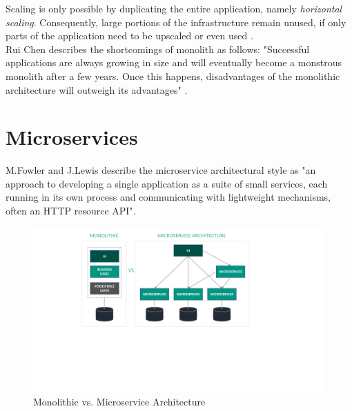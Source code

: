 Scaling is only possible by duplicating the entire application, namely \textit{horizontal scaling}. Consequently, large portions of the infrastructure remain unused, if only parts of the application need to be upscaled or even used \cite{EnticeApproach} \cite{MigratingTowardsSurvey}. \\
Rui Chen describes the shortcomings of monolith as follows: "Successful applications
are always growing in size and will eventually become a
monstrous monolith after a few years. Once this happens,
disadvantages of the monolithic architecture will outweigh
its advantages" \cite{DataflowDrivenChen}.



\section{Microservices}
\label{sec:background:microservices}
M.Fowler and J.Lewis describe the microservice architectural style as "an approach to developing a single application as a suite of small services, each running in its own process and communicating with lightweight mechanisms, often an HTTP resource API"\cite{Fowler}.

\begin{figure}[t]
	\includegraphics[width=\textwidth, trim={5cm 8cm 8cm 3cm}]{img/Architektur.pdf}
	\caption{Monolithic vs. Microservice Architecture}
	\label{fig:architekturMonolithVsMS}
\end{figure}

